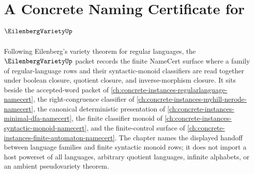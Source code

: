 \chapter{A Concrete Naming Certificate for $\EilenbergVarietyUp$}
\label{ch:concrete-instances-eilenberg-variety-namecert}

Following Eilenberg's variety theorem for regular languages, the $\EilenbergVarietyUp$ packet records the finite NameCert surface where a family of regular-language rows and their syntactic-monoid classifiers are read together under boolean closure, quotient closure, and inverse-morphism closure. It sits beside the accepted-word packet of \autoref{ch:concrete-instances-regularlanguage-namecert}, the right-congruence classifier of \autoref{ch:concrete-instances-myhill-nerode-namecert}, the canonical deterministic presentation of \autoref{ch:concrete-instances-minimal-dfa-namecert}, the finite classifier monoid of \autoref{ch:concrete-instances-syntactic-monoid-namecert}, and the finite-control surface of \autoref{ch:concrete-instances-finite-automaton-namecert}. The chapter names the displayed handoff between language families and finite syntactic monoid rows; it does not import a host powerset of all languages, arbitrary quotient languages, infinite alphabets, or an ambient pseudovariety theorem.

